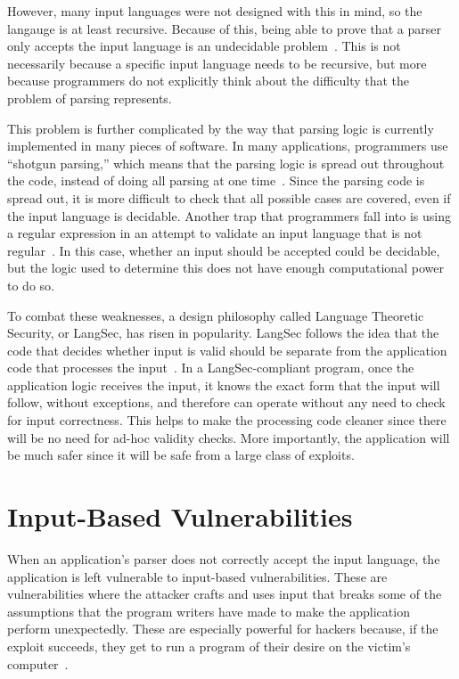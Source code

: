 However, many input languages were not designed with this in mind, so the langauge is at least recursive.  Because of this, being able to prove that a parser only accepts the input language is an undecidable problem~\cite{sassaman2011halting}.  This is not necessarily because a specific input language needs to be recursive, but more because programmers do not explicitly think about the difficulty that the problem of parsing represents.

This problem is further complicated by the way that parsing logic is currently implemented in many pieces of software.  In many applications, programmers use ``shotgun parsing,'' which means that the parsing logic is spread out throughout the code, instead of doing all parsing at one time~\cite{bratus2017parsing}.  Since the parsing code is spread out, it is more difficult to check that all possible cases are covered, even if the input language is decidable.  Another trap that programmers fall into is using a regular expression in an attempt to validate an input language that is not regular~\cite{bratus2017parsing}.  In this case, whether an input should be accepted could be decidable, but the logic used to determine this does not have enough computational power to do so.

To combat these weaknesses, a design philosophy called Language Theoretic Security, or LangSec, has risen in popularity.  LangSec follows the idea that the code that decides whether input is valid should be separate from the application code that processes the input~\cite{langsec_language-theoretic_security}.  In a LangSec-compliant program, once the application logic receives the input, it knows the exact form that the input will follow, without exceptions, and therefore can operate without any need to check for input correctness.  This helps to make the processing code cleaner since there will be no need for ad-hoc validity checks.  More importantly, the application will be much safer since it will be safe from a large class of exploits.

\section{Input-Based Vulnerabilities}
\label{sec:inputBasedVulnerabilities}
When an application's parser does not correctly accept the input language, the application is left vulnerable to input-based vulnerabilities.  These are vulnerabilities where the attacker crafts and uses input that breaks some of the assumptions that the program writers have made to make the application perform unexpectedly.  These are especially powerful for hackers because, if the exploit succeeds, they get to run a program of their desire on the victim's computer~\cite{sassaman2011halting}.

